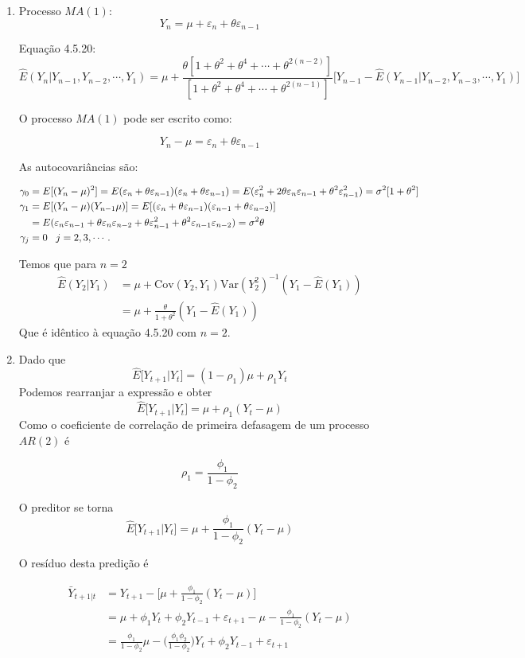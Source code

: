 \begin{enumerate}
\begin{enumerate}
	
	\item %
	Processo $MA(1)$:
	$$Y_n=\mu+\varepsilon_n+\theta\varepsilon_{n-1}$$
	
	Equação 4.5.20:
	$$\hat{E}(Y_n|Y_{n-1},Y_{n-2},\cdots,Y_1)=\mu+\frac{\theta[1+\theta^2+\theta^4+\cdots+\theta^{2(n-2)}]}{[1+\theta^2+\theta^4+\cdots+\theta^{2(n-1)}]}\bigg[Y_{n-1}-\hat{E}(Y_{n-1}|Y_{n-2},Y_{n-3},\cdots,Y_1)\bigg]$$
	
	O processo $MA(1)$ pode ser escrito como:
	
	
	
		$$Y_n-\mu=\varepsilon_n+\theta\varepsilon_{n-1}$$
	
	As autocovariâncias são:
	
	\begin{align*}
		\gamma_0&=E[(Y_n-\mu)^2]=E(\varepsilon_n+\theta\varepsilon_{n-1})(\varepsilon_n+\theta\varepsilon_{n-1})=E(\varepsilon_n^2+2\theta\varepsilon_n\varepsilon_{n-1}+\theta^2\varepsilon_{n-1}^2)=\sigma^2[{1+\theta^2}]\\
		\gamma_1&=E[(Y_n-\mu)(Y_{n-1}\-\mu)]=E[(\varepsilon_n+\theta\varepsilon_{n-1})(\varepsilon_{n-1}+\theta\varepsilon_{n-2})]\\
		&=E(\varepsilon_n \varepsilon_{n-1}+\theta\varepsilon_n\varepsilon_{n-2}+\theta\varepsilon_{n-1}^2+\theta^2\varepsilon_{n-1}\varepsilon_{n-2})=\sigma^2\theta\\
		\gamma_j&=0 \;\;\; j= 2,3,\cdots.
	\end{align*}
	
	Temos que para $n=2$
	\begin{align*}
	\hat{E}(Y_2|Y_1)&=\mu+\text{Cov}(Y_2,Y_1)\text{Var}(Y_2^2)^{-1}(Y_1-\hat{E}(Y_1))\\
	&=\mu+\frac{\theta}{1+\theta^2}(Y_1-\hat{E}(Y_1))
	\end{align*}
	Que é idêntico à equação 4.5.20 com $n=2$.

	\item %
	 Dado que $$\hat {E}\big[Y_{t+1}|Y_t\big]=(1-\rho_1)\mu+\rho_1Y_t$$
	 Podemos rearranjar a expressão e obter 
	 $$\hat {E}\big[Y_{t+1}|Y_t\big]=\mu+\rho_1(Y_t-\mu)$$
	 Como o coeficiente de correlação de primeira defasagem de um processo $AR(2)$ é
	 
	 $$\rho_1=\frac{\phi_1}{1-\phi_2}$$
	 
	 O preditor se torna
	 $$\hat {E}\big[Y_{t+1}|Y_t\big]=\mu+\frac{\phi_1}{1-\phi_2}(Y_t-\mu)$$
	 
	 O resíduo desta predição é 
	 
	 \begin{align*}
	 \bar{Y}_{t+1|t}&=Y_{t+1}-\Bigg[\mu+\frac{\phi_1}{1-\phi_2}(Y_t-\mu)\Bigg]\\
	 &=\mu+\phi_1Y_t+\phi_2Y_{t-1}+\varepsilon_{t+1}-\mu-\frac{\phi_1}{1-\phi_2}(Y_t-\mu)\\
	 &=\frac{\phi_1}{1-\phi_2}\mu-\Bigg(\frac{\phi_1\phi_2}{1-\phi_2}\Bigg)Y_t+\phi_2Y_{t-1}+\varepsilon_{t+1}
	 \end{align*}
	

\end{enumerate}
\end{enumerate}
